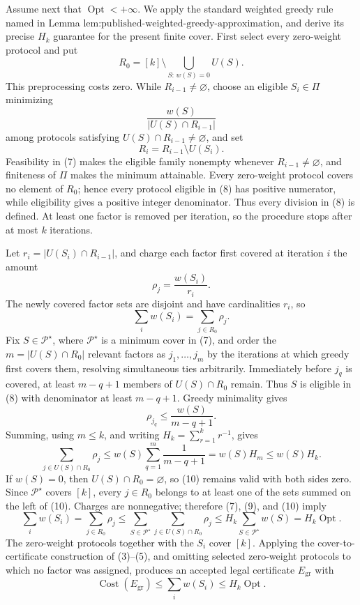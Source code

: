 Assume next that \(\operatorname{Opt}<+\infty\).  We apply the standard weighted greedy rule named in Lemma \(\text{lem:published-weighted-greedy-approximation}\), and derive its precise \(H_k\) guarantee for the present finite cover.  First select every zero-weight protocol and put
\[
 R_0=[k]\setminus\bigcup_{S:\,w(S)=0}U(S).
\]
This preprocessing costs zero.  While \(R_{i-1}\neq\varnothing\), choose an eligible \(S_i\in\Pi\) minimizing
\[
 \frac{w(S)}{|U(S)\cap R_{i-1}|}
\tag{8}
\]
among protocols satisfying \(U(S)\cap R_{i-1}\neq\varnothing\), and set
\[
 R_i=R_{i-1}\setminus U(S_i).
\]
Feasibility in (7) makes the eligible family nonempty whenever \(R_{i-1}\neq\varnothing\), and finiteness of \(\Pi\) makes the minimum attainable.  Every zero-weight protocol covers no element of \(R_0\); hence every protocol eligible in (8) has positive numerator, while eligibility gives a positive integer denominator.  Thus every division in (8) is defined.  At least one factor is removed per iteration, so the procedure stops after at most \(k\) iterations.

Let \(r_i=|U(S_i)\cap R_{i-1}|\), and charge each factor first covered at iteration \(i\) the amount
\[
 \rho_j=\frac{w(S_i)}{r_i}.
\]
The newly covered factor sets are disjoint and have cardinalities \(r_i\), so
\[
 \sum_i w(S_i)=\sum_{j\in R_0}\rho_j.
\tag{9}
\]
Fix \(S\in\mathcal P^{\star}\), where \(\mathcal P^{\star}\) is a minimum cover in (7), and order the \(m=|U(S)\cap R_0|\) relevant factors as \(j_1,\ldots,j_m\) by the iterations at which greedy first covers them, resolving simultaneous ties arbitrarily.  Immediately before \(j_q\) is covered, at least \(m-q+1\) members of \(U(S)\cap R_0\) remain.  Thus \(S\) is eligible in (8) with denominator at least \(m-q+1\).  Greedy minimality gives
\[
 \rho_{j_q}\leq \frac{w(S)}{m-q+1}.
\]
Summing, using \(m\leq k\), and writing \(H_k=\sum_{r=1}^{k}r^{-1}\), gives
\[
 \sum_{j\in U(S)\cap R_0}\rho_j
 \leq w(S)\sum_{q=1}^{m}\frac{1}{m-q+1}
 =w(S)H_m
 \leq w(S)H_k.
\tag{10}
\]
If \(w(S)=0\), then \(U(S)\cap R_0=\varnothing\), so (10) remains valid with both sides zero.  Since \(\mathcal P^{\star}\) covers \([k]\), every \(j\in R_0\) belongs to at least one of the sets summed on the left of (10).  Charges are nonnegative; therefore (7), (9), and (10) imply
\[
 \sum_i w(S_i)
 =\sum_{j\in R_0}\rho_j
 \leq\sum_{S\in\mathcal P^{\star}}
       \sum_{j\in U(S)\cap R_0}\rho_j
 \leq H_k\sum_{S\in\mathcal P^{\star}}w(S)
 =H_k\operatorname{Opt}.
\tag{11}
\]
The zero-weight protocols together with the \(S_i\) cover \([k]\).  Applying the cover-to-certificate construction of (3)--(5), and omitting selected zero-weight protocols to which no factor was assigned, produces an accepted legal certificate \(E_{\mathrm{gr}}\) with
\[
 \operatorname{Cost}(E_{\mathrm{gr}})
 \leq\sum_i w(S_i)
 \leq H_k\operatorname{Opt}.
\]

